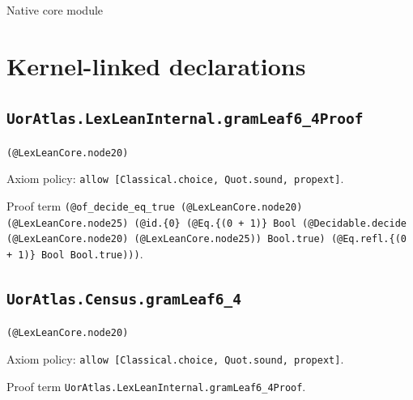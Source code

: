\documentclass[11pt]{article}
\begin{document}
\begin{center}{\LARGE Native core module}\end{center}
\section*{Kernel-linked declarations}
\subsection*{\texttt{UorAtlas.LexLeanInternal.gramLeaf6\_4Proof}}
\noindent\texttt{(@LexLeanCore.node20)}\par
\noindent Axiom policy: \texttt{allow [Classical.choice, Quot.sound, propext]}.\par
\noindent Proof term \texttt{(@of\_decide\_eq\_true (@LexLeanCore.node20) (@LexLeanCore.node25) (@id.\{0\} (@Eq.\{(0 + 1)\} Bool (@Decidable.decide (@LexLeanCore.node20) (@LexLeanCore.node25)) Bool.true) (@Eq.refl.\{(0 + 1)\} Bool Bool.true)))}.\par
\subsection*{\texttt{UorAtlas.Census.gramLeaf6\_4}}
\noindent\texttt{(@LexLeanCore.node20)}\par
\noindent Axiom policy: \texttt{allow [Classical.choice, Quot.sound, propext]}.\par
\noindent Proof term \texttt{UorAtlas.LexLeanInternal.gramLeaf6\_4Proof}.\par
\end{document}
